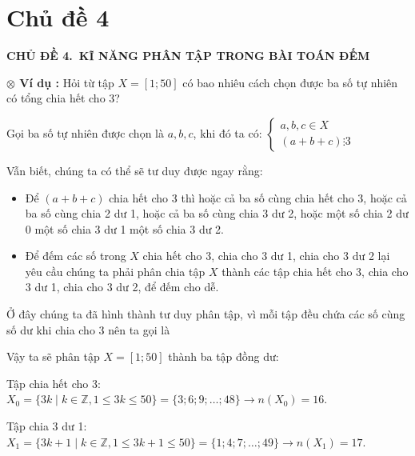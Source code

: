 \documentclass[12pt, a4paper]{article}
\begin{document}
		
		\clearpage
			\section*{Chủ đề 4}
		\begin{tcolorbox}[colback=headerbg, colframe=headerborder, arc=3mm, boxrule=1.5pt, halign=center]
			\textbf{\Large CHỦ ĐỀ 4.\ KĨ NĂNG PHÂN TẬP TRONG BÀI TOÁN ĐẾM}
		\end{tcolorbox}
		
		\vspace{0.5cm}
		\parbox{0.96\textwidth}{
		\textbf{\color{blue}$\boldsymbol{\otimes}$ Ví dụ :} Hỏi từ tập \(X = [1; 50]\) có bao nhiêu cách chọn được ba số tự nhiên có tổng chia hết cho 3?
	}
	
		
		\noindent Gọi ba số tự nhiên được chọn là \(a, b, c\), khi đó ta có: 
		$\begin{cases} 
			a, b, c \in X \\ 
			(a + b + c) \vdots 3 
		\end{cases}$
		
		\noindent Vẫn biết, chúng ta có thể sẽ tư duy được ngay rằng:
		\begin{itemize}
			\item Để \((a + b + c)\) chia hết cho 3 thì hoặc cả ba số cùng chia hết cho 3, hoặc cả ba số cùng chia 2 dư 1, hoặc cả ba số cùng chia 3 dư 2, hoặc một số chia 2 dư 0 một số chia 3 dư 1 một số chia 3 dư 2.
			\item Để đếm các số trong \(X\) chia hết cho 3, chia cho 3 dư 1, chia cho 3 dư 2 lại yêu cầu chúng ta phải phân chia tập \(X\) thành các tập chia hết cho 3, chia cho 3 dư 1, chia cho 3 dư 2, để đếm cho dễ.
		\end{itemize}
		
		\noindent Ở đây chúng ta đã hình thành tư duy phân tập, vì mỗi tập đều chứa các số cùng số dư khi chia cho 3 nên ta gọi là 
		
		\noindent Vậy ta sẽ phân tập \(X = [1; 50]\) thành ba tập đồng dư:
		
		\noindent Tập chia hết cho 3: \(X_0 = \{3k \mid k \in \mathbb{Z}, 1 \le 3k \le 50\} = \{3; 6; 9; \dots; 48\} \longrightarrow n(X_0) = 16\).
		
		\noindent Tập chia 3 dư 1: \(X_1 = \{3k + 1 \mid k \in \mathbb{Z}, 1 \le 3k + 1 \le 50\} = \{1; 4; 7; \dots; 49\} \longrightarrow n(X_1) = 17\).
		
\end{document}
